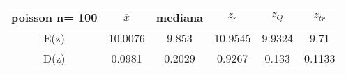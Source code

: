 \begin{tabular}{|c|c|c|c|c|c|}
\hline
poisson n= 100& $\overline{x}$ & mediana & $z_r$ & $z_Q$ & $z_{tr}$ \\ \hline
E(z) & 10.0076 & 9.853 & 10.9545 & 9.9324 & 9.71 \\ \hline
D(z) & 0.0981 & 0.2029 & 0.9267 & 0.133 & 0.1133 \\ \hline
\end{tabular}
